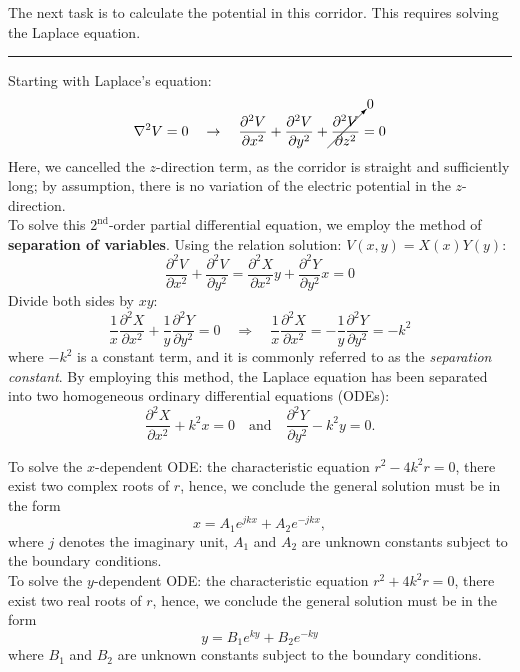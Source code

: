 \documentclass[a4paper, 12pt]{article}
\begin{document}
\begin{mdframed}
The next task is to calculate the potential in this corridor. This requires solving the Laplace equation.

\vspace{.3cm}  \hrule \vspace{.3cm}

Starting with Laplace's equation:
\[
    \nabla^{2}V = 0 
    \quad \to \quad 
    \frac{\partial^{2} V}{\partial x^{2}} + \frac{\partial^{2} V}{\partial y^{2}} + \cancelto{0}{\frac{\partial^{2} V}{\partial z^{2}}} = 0
\]
Here, we cancelled the $z$-direction term, as the corridor is straight and sufficiently long; by assumption, there is no variation of the electric potential in the $z$-direction. \\

To solve this $2^{\text{nd}}$-order partial differential equation, we employ the method of \textbf{separation of variables}. Using the relation solution: $V(x, y) = X(x) Y(y)$:
\[
    \frac{\partial^{2} V}{\partial x^{2}} + \frac{\partial^{2} V}{\partial y^{2}} 
    = 
    \frac{\partial^{2} X}{\partial x^{2}}y + \frac{\partial^{2} Y}{\partial y^{2}}x 
    = 0
\]
Divide both sides by $xy$:
\[
    \frac{1}{x} \frac{\partial^{2} X}{\partial x^{2}} + \frac{1}{y} \frac{\partial^{2} Y}{\partial y^{2}} = 0 
    \quad \Rightarrow \quad
    \frac{1}{x} \frac{\partial^{2} X}{\partial x^{2}} = -\frac{1}{y} \frac{\partial^{2} Y}{\partial y^{2}} = -k^{2}
\]
where $-k^2$ is a constant term, and it is commonly referred to as the \textit{separation constant}. By employing this method, the Laplace equation has been separated into two homogeneous ordinary differential equations (ODEs):
\[ 
    \frac{\partial^{2} X}{\partial x^{2}} + k^{2}x = 0 
    \quad \text{and} \quad 
    \frac{\partial^{2} Y}{\partial y^{2}} - k^{2}y = 0.
\]

To solve the $x$-dependent ODE: the characteristic equation $r^2-4k^2r = 0$, there exist two complex roots of $r$, hence, we conclude the general solution must be in the form 
\[
    x = A_{1}e^{jkx}+ A_{2}e^{-jkx},
\]
where $j$ denotes the imaginary unit, $A_1$ and $A_2$ are unknown constants subject to the boundary conditions. \\

To solve the $y$-dependent ODE: the characteristic equation $r^2+4k^2r = 0$, there exist two real roots of $r$, hence, we conclude the general solution must be in the form 
\[
    y = B_{1}e^{ky}+B_{2}e^{-ky}
\]
where $B_1$ and $B_2$ are unknown constants subject to the boundary conditions. \\


\end{mdframed}
\end{document}
